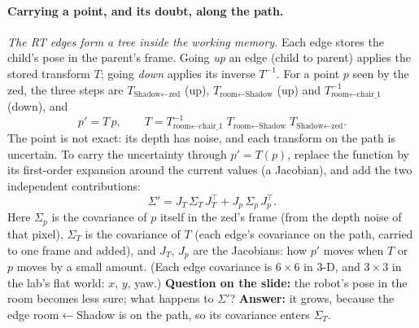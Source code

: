 \documentclass[11pt]{article}
\newcommand{\slt}[1]{\emph{#1}}   %
\begin{document}
\begin{center}
\end{center}

\paragraph{Carrying a point, and its doubt, along the path.} \slt{The RT edges form a tree inside the working memory.} Each edge stores the child's pose in the parent's frame. Going \emph{up} an edge (child to parent) applies the stored transform $T$; going \emph{down} applies its inverse $T^{-1}$. For a point $p$ seen by the zed, the three steps are $T_{\text{Shadow}\leftarrow\text{zed}}$ (up), $T_{\text{room}\leftarrow\text{Shadow}}$ (up) and $T^{-1}_{\text{room}\leftarrow\text{chair\_1}}$ (down), and
\[
p' = T\,p,\qquad T = T^{-1}_{\text{room}\leftarrow\text{chair\_1}}\;T_{\text{room}\leftarrow\text{Shadow}}\;T_{\text{Shadow}\leftarrow\text{zed}} .
\]
The point is not exact: its depth has noise, and each transform on the path is uncertain. To carry the uncertainty through $p'=T(p)$, replace the function by its first-order expansion around the current values (a Jacobian), and add the two independent contributions:
\[
\Sigma' = J_T\,\Sigma_T\,J_T^{\top} + J_p\,\Sigma_p\,J_p^{\top}.
\]
Here $\Sigma_p$ is the covariance of $p$ itself in the zed's frame (from the depth noise of that pixel), $\Sigma_T$ is the covariance of $T$ (each edge's covariance on the path, carried to one frame and added), and $J_T$, $J_p$ are the Jacobians: how $p'$ moves when $T$ or $p$ moves by a small amount. (Each edge covariance is $6\times6$ in 3-D, and $3\times3$ in the lab's flat world: $x$, $y$, yaw.) \textbf{Question on the slide:} the robot's pose in the room becomes less sure; what happens to $\Sigma'$? \textbf{Answer:} it grows, because the edge room$\leftarrow$Shadow is on the path, so its covariance enters $\Sigma_T$.
\end{document}
